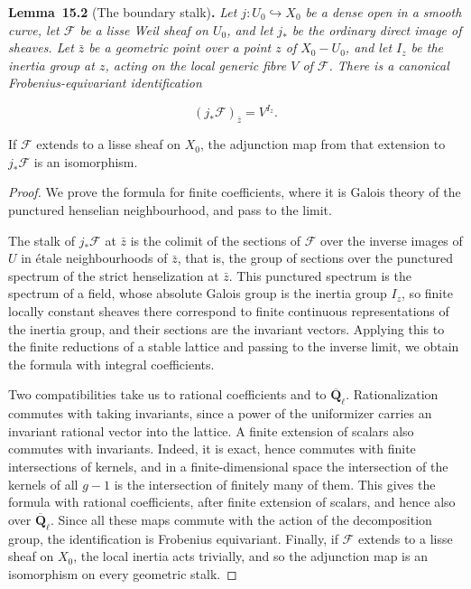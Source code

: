 \documentclass[11pt]{article}
\newenvironment{bpstatement}[2]{\par\addvspace{0.6\baselineskip}\noindent\textbf{#1}#2\textbf{.}\enspace\ignorespaces}
  {\par\addvspace{0.4\baselineskip}}
\newenvironment{bpstatementit}[2]{\begin{bpstatement}{#1}{#2}\itshape\ignorespaces}{\end{bpstatement}}
\begin{document}
\label{bp6}%
\begin{bpstatementit}{Lemma~15.2}{ (The boundary stalk)}
Let \(j:U_0\hookrightarrow X_0\) be a dense open in a smooth curve, let \(\mathcal F\) be a lisse Weil sheaf on \(U_0\), and let \(j_*\) be the ordinary direct image of sheaves. Let \(\bar z\) be a geometric point over a point \(z\) of \(X_0-U_0\), and let \(I_z\) be the inertia group at \(z\), acting on the local generic fibre \(V\) of \(\mathcal F\). There is a canonical Frobenius-equivariant identification

\[
(j_*\mathcal F)_{\bar z}=V^{I_z}.
\]

If \(\mathcal F\) extends to a lisse sheaf on \(X_0\), the adjunction map from that extension to \(j_*\mathcal F\) is an isomorphism.
\end{bpstatementit}

\begin{proof}[{Proof}]\label{bp7}%
We prove the formula for finite coefficients, where it is Galois theory of the punctured henselian neighbourhood, and pass to the limit.

The stalk of \(j_*\mathcal F\) at \(\bar z\) is the colimit of the sections of \(\mathcal F\) over the inverse images of \(U\) in étale neighbourhoods of \(\bar z\), that is, the group of sections over the punctured spectrum of the strict henselization at \(\bar z\). This punctured spectrum is the spectrum of a field, whose absolute Galois group is the inertia group \(I_z\), so finite locally constant sheaves there correspond to finite continuous representations of the inertia group, and their sections are the invariant vectors. Applying this to the finite reductions of a stable lattice and passing to the inverse limit, we obtain the formula with integral coefficients.

Two compatibilities take us to rational coefficients and to \(\overline{\mathbf Q}_\ell\). Rationalization commutes with taking invariants, since a power of the uniformizer carries an invariant rational vector into the lattice.  A finite extension of scalars also commutes with invariants. Indeed, it is exact, hence commutes with finite intersections of kernels, and in a finite-dimensional space the intersection of the kernels of all \(g-1\) is the intersection of finitely many of them. This gives the formula with rational coefficients, after finite extension of scalars, and hence also over \(\overline{\mathbf Q}_\ell\). Since all these maps commute with the action of the decomposition group, the identification is Frobenius equivariant. Finally, if \(\mathcal F\) extends to a lisse sheaf on \(X_0\), the local inertia acts trivially, and so the adjunction map is an isomorphism on every geometric stalk.
\end{proof}
\end{document}
